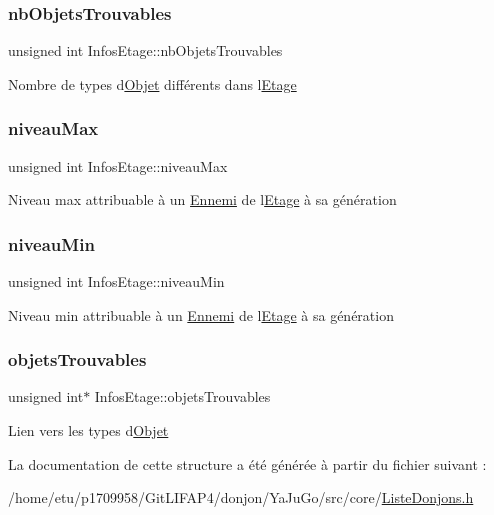 \subsubsection{\texorpdfstring{nb\+Objets\+Trouvables}{nbObjetsTrouvables}}
{\footnotesize\ttfamily unsigned int Infos\+Etage\+::nb\+Objets\+Trouvables}

Nombre de types d\textquotesingle{}\mbox{\hyperlink{structObjet}{Objet}} différents dans l\textquotesingle{}\mbox{\hyperlink{classEtage}{Etage}} \mbox{\label{structInfosEtage_aaf5b1d9d8f307371429529879d56e0a7}} 
\subsubsection{\texorpdfstring{niveau\+Max}{niveauMax}}
{\footnotesize\ttfamily unsigned int Infos\+Etage\+::niveau\+Max}

Niveau max attribuable à un \mbox{\hyperlink{classEnnemi}{Ennemi}} de l\textquotesingle{}\mbox{\hyperlink{classEtage}{Etage}} à sa génération \mbox{\label{structInfosEtage_a579c406b3b58d6d68b81871680371e37}} 
\subsubsection{\texorpdfstring{niveau\+Min}{niveauMin}}
{\footnotesize\ttfamily unsigned int Infos\+Etage\+::niveau\+Min}

Niveau min attribuable à un \mbox{\hyperlink{classEnnemi}{Ennemi}} de l\textquotesingle{}\mbox{\hyperlink{classEtage}{Etage}} à sa génération \mbox{\label{structInfosEtage_aed27c79c0b551c4d527ed162b6ba1352}} 
\subsubsection{\texorpdfstring{objets\+Trouvables}{objetsTrouvables}}
{\footnotesize\ttfamily unsigned int$\ast$ Infos\+Etage\+::objets\+Trouvables}

Lien vers les types d\textquotesingle{}\mbox{\hyperlink{structObjet}{Objet}} 

La documentation de cette structure a été générée à partir du fichier suivant \+:\begin{DoxyCompactItemize}
\item 
/home/etu/p1709958/\+Git\+L\+I\+F\+A\+P4/donjon/\+Ya\+Ju\+Go/src/core/\mbox{\hyperlink{ListeDonjons_8h}{Liste\+Donjons.\+h}}\end{DoxyCompactItemize}
